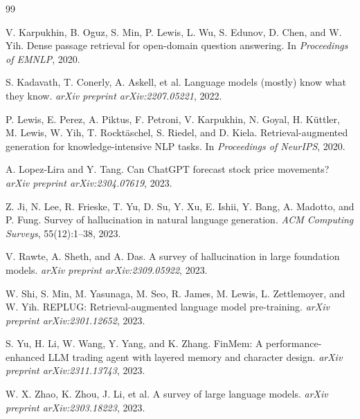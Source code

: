\documentclass{article}
\begin{document}

\begin{thebibliography}{99}

V. Karpukhin, B. Oguz, S. Min, P. Lewis, L. Wu, S. Edunov, D. Chen, and W. Yih.
Dense passage retrieval for open-domain question answering.
In \textit{Proceedings of EMNLP}, 2020.

S. Kadavath, T. Conerly, A. Askell, et al.
Language models (mostly) know what they know.
\textit{arXiv preprint arXiv:2207.05221}, 2022.

P. Lewis, E. Perez, A. Piktus, F. Petroni, V. Karpukhin, N. Goyal, H. K\"{u}ttler,
M. Lewis, W. Yih, T. Rockt\"{a}schel, S. Riedel, and D. Kiela.
Retrieval-augmented generation for knowledge-intensive NLP tasks.
In \textit{Proceedings of NeurIPS}, 2020.

A. Lopez-Lira and Y. Tang.
Can ChatGPT forecast stock price movements?
\textit{arXiv preprint arXiv:2304.07619}, 2023.

Z. Ji, N. Lee, R. Frieske, T. Yu, D. Su, Y. Xu, E. Ishii, Y. Bang, A. Madotto, and P. Fung.
Survey of hallucination in natural language generation.
\textit{ACM Computing Surveys}, 55(12):1--38, 2023.

V. Rawte, A. Sheth, and A. Das.
A survey of hallucination in large foundation models.
\textit{arXiv preprint arXiv:2309.05922}, 2023.

W. Shi, S. Min, M. Yasunaga, M. Seo, R. James, M. Lewis, L. Zettlemoyer, and W. Yih.
REPLUG: Retrieval-augmented language model pre-training.
\textit{arXiv preprint arXiv:2301.12652}, 2023.

S. Yu, H. Li, W. Wang, Y. Yang, and K. Zhang.
FinMem: A performance-enhanced LLM trading agent with layered memory and character design.
\textit{arXiv preprint arXiv:2311.13743}, 2023.

W. X. Zhao, K. Zhou, J. Li, et al.
A survey of large language models.
\textit{arXiv preprint arXiv:2303.18223}, 2023.

\end{thebibliography}

\newpage

\end{document}
